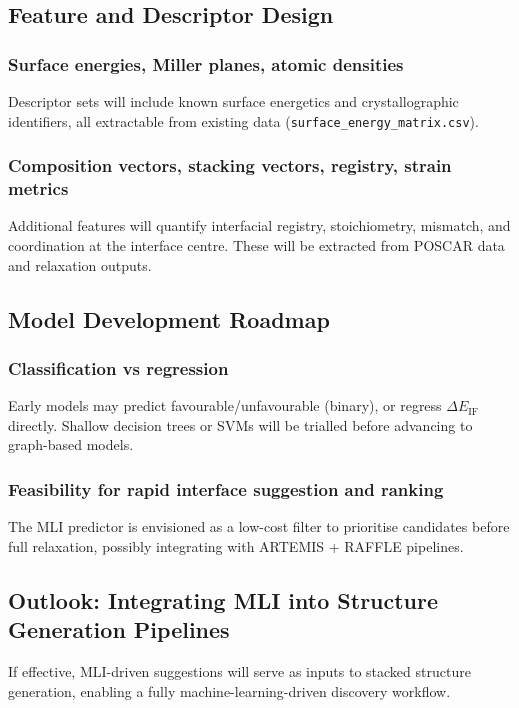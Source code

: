 \subsection{Feature and Descriptor Design}

\subsubsection{Surface energies, Miller planes, atomic densities}
Descriptor sets will include known surface energetics and crystallographic identifiers, all extractable from existing
data (\texttt{surface\_energy\_matrix.csv}).

\subsubsection{Composition vectors, stacking vectors, registry, strain metrics}
Additional features will quantify interfacial registry, stoichiometry, mismatch, and coordination at the interface
centre. These will be extracted from POSCAR data and relaxation outputs.

\subsection{Model Development Roadmap}

\subsubsection{Classification vs regression}
Early models may predict favourable/unfavourable (binary), or regress $\Delta E_\mathrm{IF}$ directly. Shallow decision
trees or SVMs will be trialled before advancing to graph-based models.

\subsubsection{Feasibility for rapid interface suggestion and ranking}
The MLI predictor is envisioned as a low-cost filter to prioritise candidates before full relaxation, possibly
integrating with ARTEMIS + RAFFLE pipelines.

\subsection{Outlook: Integrating MLI into Structure Generation Pipelines}
If effective, MLI-driven suggestions will serve as inputs to stacked structure generation, enabling a fully
machine-learning-driven discovery workflow.


